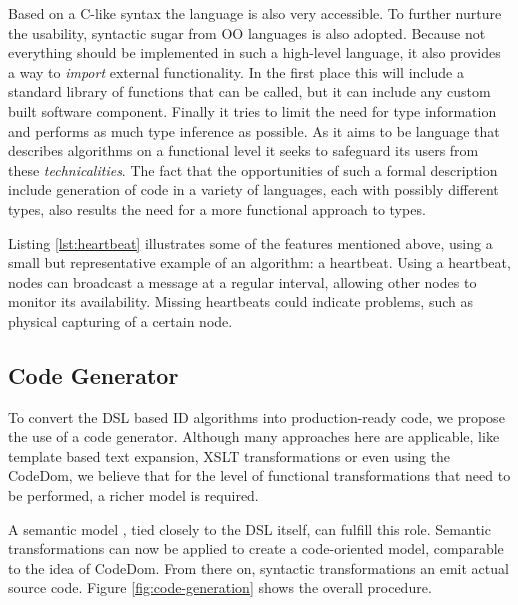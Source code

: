 \documentclass[conference]{IEEEtran}
\newcommand{\NAME}{id-foo\xspace}
\begin{document}
Based on a C-like syntax the language is also very accessible. To further
nurture the usability, syntactic sugar from OO languages is also adopted.
Because not everything should be implemented in such a high-level language, it
also provides a way to \emph{import} external functionality. In the first place
this will include a standard library of functions that can be called, but it
can include any custom built software component. Finally it tries to limit the
need for type information and performs as much type inference as possible. As
it aims to be language that describes algorithms on a functional level it seeks
to safeguard its users from these \emph{technicalities}. The fact that the
opportunities of such a formal description include generation of code in a
variety of languages, each with possibly different types, also results the need
for a more functional approach to types.

Listing \ref{lst:heartbeat} illustrates some of the features mentioned above,
using a small but representative example of an algorithm: a heartbeat. Using a
heartbeat, nodes can broadcast a message at a regular interval, allowing other
nodes to monitor its availability. Missing heartbeats could indicate problems,
such as physical capturing of a certain node.



\subsection{Code Generator}

To convert the DSL based ID algorithms into production-ready code, we propose
the use of a code generator. Although many approaches here are applicable, like
template based text expansion, XSLT transformations or even using the
CodeDom\cite{dollard2004code}, we believe that for the level of functional
transformations that need to be performed, a richer model is required.

A semantic model \cite{fowler2010domain}, tied closely to the DSL itself, can
fulfill this role. Semantic transformations can now be applied to create a
code-oriented model, comparable to the idea of CodeDom. From there on,
syntactic transformations an emit actual source code. Figure
\ref{fig:code-generation} shows the overall procedure.

\end{document}
